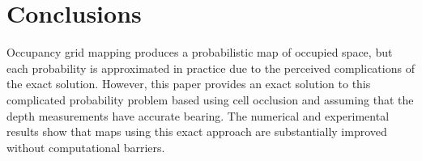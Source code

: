 \documentclass[letterpaper, 10pt, conference]{ieeeconf}
\begin{document}
\section{Conclusions}

Occupancy grid mapping produces a probabilistic map of occupied space, but each probability is approximated in practice due to the perceived complications of the exact solution.
However, this paper provides an exact solution to this complicated probability problem based using cell occlusion and assuming that the depth measurements have accurate bearing.
The numerical and experimental results show that maps using this exact approach are substantially improved without computational barriers.
	

	


\end{document}
